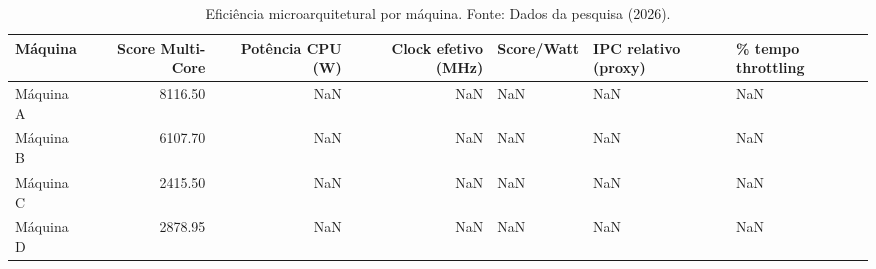 \begin{table}[ht]
\centering
\caption{Eficiência microarquitetural por máquina. Fonte: Dados da pesquisa (2026).}
\label{tab:eficiencia_microarquitetural}
\begin{tabular}{lrrrlll}
\toprule
Máquina & Score Multi-Core & Potência CPU (W) & Clock efetivo (MHz) & Score/Watt & IPC relativo (proxy) & \% tempo throttling \\
\midrule
Máquina A & 8116.50 & NaN & NaN & NaN & NaN & NaN \\
Máquina B & 6107.70 & NaN & NaN & NaN & NaN & NaN \\
Máquina C & 2415.50 & NaN & NaN & NaN & NaN & NaN \\
Máquina D & 2878.95 & NaN & NaN & NaN & NaN & NaN \\
\bottomrule
\end{tabular}
\end{table}
